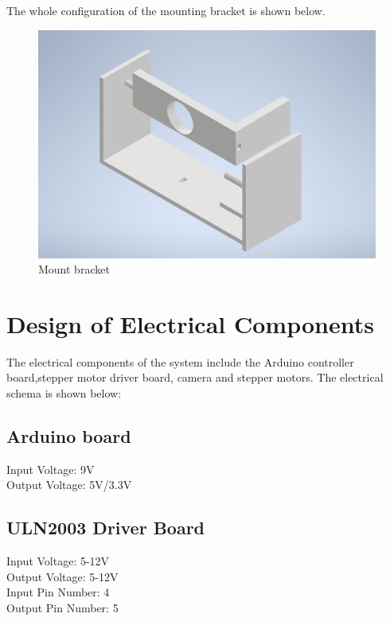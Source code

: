 \documentclass[12pt, titlepage]{article}
\begin{document}
The whole configuration of the mounting bracket is shown below.
\begin{figure}[H]
\caption{Mount bracket}
\centering
\includegraphics[width=\textwidth]{whole_part.png}
\end{figure}


\section{Design of Electrical Components}


The electrical components of the system include the Arduino controller board,stepper motor driver board, camera and stepper motors. The electrical schema is shown below:\\
\subsection{Arduino board}
Input Voltage: 9V\\
Output Voltage: 5V/3.3V

\subsection{ULN2003 Driver Board}
	Input Voltage: 5-12V\\
	Output Voltage: 5-12V\\
	Input Pin Number: 4\\
	Output Pin Number: 5 \\
\end{document}

